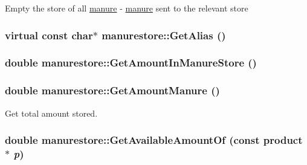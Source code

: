 \label{classmanurestore_a079653ec01b9b278a16e9f03eccd73e9}
Empty the store of all \hyperlink{classmanure}{manure} -\/ \hyperlink{classmanure}{manure} sent to the relevant store \hypertarget{classmanurestore_abda404dea9d79e860e6ee86205c15114}{
\subsubsection[{GetAlias}]{\setlength{\rightskip}{0pt plus 5cm}virtual const char$\ast$ manurestore::GetAlias ()}}
\label{classmanurestore_abda404dea9d79e860e6ee86205c15114}
\hypertarget{classmanurestore_a6f665424507d6f813c0e955d3170ca66}{
\subsubsection[{GetAmountInManureStore}]{\setlength{\rightskip}{0pt plus 5cm}double manurestore::GetAmountInManureStore ()}}
\label{classmanurestore_a6f665424507d6f813c0e955d3170ca66}
\hypertarget{classmanurestore_a7f6972189e8c5c44887abaaad7b563ae}{
\subsubsection[{GetAmountManure}]{\setlength{\rightskip}{0pt plus 5cm}double manurestore::GetAmountManure ()}}
\label{classmanurestore_a7f6972189e8c5c44887abaaad7b563ae}
Get total amount stored. \hypertarget{classmanurestore_a2de53bf7077d84143c1014b1716c9bd8}{
\subsubsection[{GetAvailableAmountOf}]{\setlength{\rightskip}{0pt plus 5cm}double manurestore::GetAvailableAmountOf (const {\bf product} $\ast$ {\em p})}}
